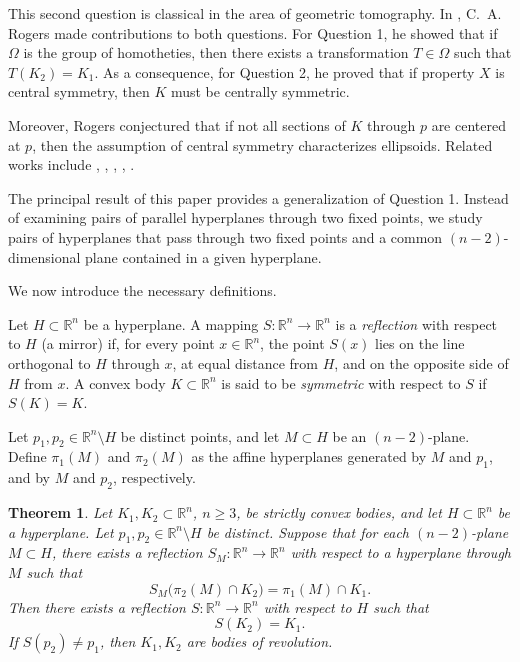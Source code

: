 \documentclass[12pt]{article}
\newtheorem{theorem}{Theorem}
\begin{document}
This second question is classical in the area of geometric tomography. In \cite{Rogers1965}, C.~A. Rogers made contributions to both questions. For Question 1, he showed that if $\Omega$ is the group of homotheties, then there exists a transformation $T \in \Omega$ such that $T(K_2) = K_1$. As a consequence, for Question 2, he proved that if property $X$ is central symmetry, then $K$ must be centrally symmetric.

Moreover, Rogers conjectured that if not all sections of $K$ through $p$ are centered at $p$, then the assumption of central symmetry characterizes ellipsoids. Related works include \cite{Aitchison1971}, \cite{Larman1974}, \cite{MontejanoMorales2003}, \cite{MontejanoMorales2007a}, \cite{MontejanoMorales2007b}.

The principal result of this paper provides a generalization of Question 1. Instead of examining pairs of parallel hyperplanes through two fixed points, we study pairs of hyperplanes that pass through two fixed points and a common $(n-2)$-dimensional plane contained in a given hyperplane.

We now introduce the necessary definitions.

Let $H \subset \mathbb{R}^n$ be a hyperplane. A mapping $S : \mathbb{R}^n \to \mathbb{R}^n$ is a \emph{reflection} with respect to $H$ (a mirror) if, for every point $x \in \mathbb{R}^n$, the point $S(x)$ lies on the line orthogonal to $H$ through $x$, at equal distance from $H$, and on the opposite side of $H$ from $x$. A convex body $K \subset \mathbb{R}^n$ is said to be \emph{symmetric} with respect to $S$ if $S(K) = K$.

Let $p_1, p_2 \in \mathbb{R}^n \setminus H$ be distinct points, and let $M \subset H$ be an $(n-2)$-plane. Define $\pi_1(M)$ and $\pi_2(M)$ as the affine hyperplanes generated by $M$ and $p_1$, and by $M$ and $p_2$, respectively.

\begin{theorem}\label{mainthm}
	Let $K_1, K_2 \subset \mathbb{R}^n$, $n \geq 3$, be strictly convex bodies, and let $H \subset \mathbb{R}^n$ be a hyperplane. Let $p_1, p_2 \in \mathbb{R}^n \setminus H$ be distinct. Suppose that for each $(n-2)$-plane $M \subset H$, there exists a reflection $S_M : \mathbb{R}^n \to \mathbb{R}^n$ with respect to a hyperplane through $M$ such that
	\[
	S_M\big(\pi_2(M) \cap K_2\big) = \pi_1(M) \cap K_1.
	\]
	Then there exists a reflection $S : \mathbb{R}^n \to \mathbb{R}^n$ with respect to $H$ such that
	\[
	S(K_2) = K_1.
	\]
         If $S(p_2)\not = p_1$, then $K_1,K_2$ are bodies of revolution.
\end{theorem}
\end{document}
